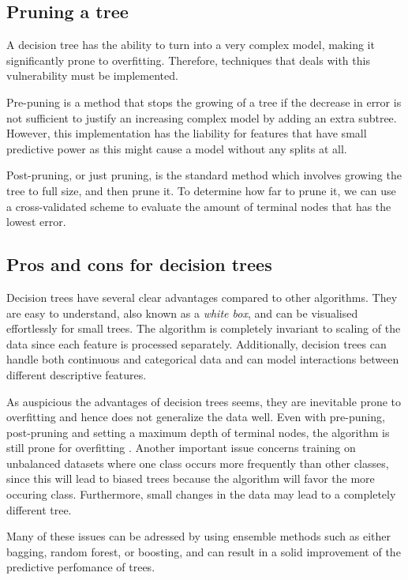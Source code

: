 \subsection{Pruning a tree}

A decision tree has the ability to turn into a very complex model, making it significantly prone to overfitting. Therefore, techniques that deals with this vulnerability must be implemented.

Pre-puning is a method that stops the growing of a tree if the decrease in error is not sufficient to justify an increasing complex model by adding an extra subtree. However, this implementation has the liability for features that have small predictive power as this might cause a model without any splits at all.

Post-pruning, or just pruning, is the standard method which involves growing the tree to full size, and then prune it. To determine how far to prune it, we can use a cross-validated scheme to evaluate the amount of terminal nodes that has the lowest error.

\subsection{Pros and cons for decision trees}

Decision trees have several clear advantages compared to other algorithms. They are easy to understand, also known as a \textit{white box}, and can be visualised effortlessly for small trees. The algorithm is completely invariant to scaling of the data since each feature is processed separately. Additionally, decision trees can handle both continuous and categorical data and can model interactions between different descriptive features.

As auspicious the advantages of decision trees seems, they are inevitable prone to overfitting and hence does not generalize the data well. Even with pre-puning, post-pruning and setting a maximum depth of terminal nodes, the algorithm is still prone for overfitting \cite{Guido2016}. Another important issue concerns training on unbalanced datasets where one class occurs more frequently than other classes, since this will lead to biased trees because the algorithm will favor the more occuring class. Furthermore, small changes in the data may lead to a completely different tree.

Many of these issues can be adressed by using ensemble methods such as either bagging, random forest, or boosting, and can result in a solid improvement of the predictive perfomance of trees.

